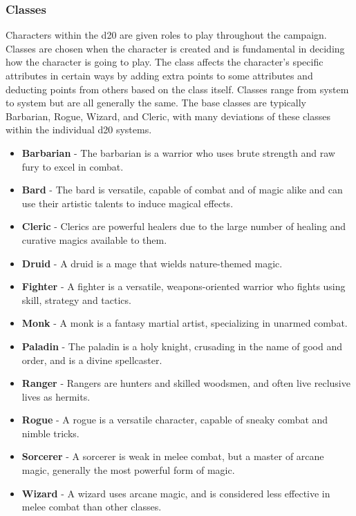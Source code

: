 \documentclass[12pt,a4paper]{report}
\begin{document}
		\subsubsection{Classes}
			Characters within the d20 are given roles to play throughout the campaign. Classes are chosen when the character is created and is fundamental in deciding how the character is going to play. The class affects the character's specific attributes in certain ways by adding extra points to some attributes and deducting points from others based on the class itself. Classes range from system to system but are all generally the same. The base classes are typically Barbarian, Rogue, Wizard, and Cleric, with many deviations of these classes within the individual d20 systems.
			\begin{itemize}
				\item \textbf{Barbarian} - The barbarian is a warrior who uses brute strength and raw fury to excel in combat.
				\item \textbf{Bard} - The bard is versatile, capable of combat and of magic alike and can use their artistic talents to induce magical effects.
				\item \textbf{Cleric} - Clerics are powerful healers due to the large number of healing and curative magics available to them. 
				\item \textbf{Druid} - A druid is a mage that wields nature-themed magic.
				\item \textbf{Fighter} - A fighter is a versatile, weapons-oriented warrior who fights using skill, strategy and tactics.
				\item \textbf{Monk} - A monk is a fantasy martial artist, specializing in unarmed combat.
				\item \textbf{Paladin} - The paladin is a holy knight, crusading in the name of good and order, and is a divine spellcaster.
				\item \textbf{Ranger} - Rangers are hunters and skilled woodsmen, and often live reclusive lives as hermits.
				\item \textbf{Rogue} - A rogue is a versatile character, capable of sneaky combat and nimble tricks.
				\item \textbf{Sorcerer} - A sorcerer is weak in melee combat, but a master of arcane magic, generally the most powerful form of magic. 
				\item \textbf{Wizard} - A wizard uses arcane magic, and is considered less effective in melee combat than other classes.
			\end{itemize}
		\newpage
\end{document}
